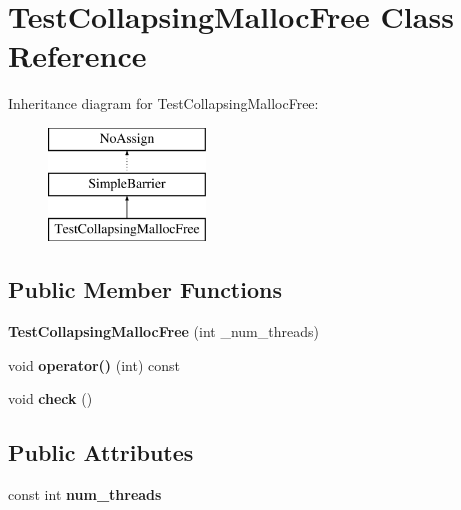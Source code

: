 \hypertarget{classTestCollapsingMallocFree}{}\section{Test\+Collapsing\+Malloc\+Free Class Reference}
\label{classTestCollapsingMallocFree}
Inheritance diagram for Test\+Collapsing\+Malloc\+Free\+:\begin{figure}[H]
\begin{center}
\leavevmode
\includegraphics[height=3.000000cm]{classTestCollapsingMallocFree}
\end{center}
\end{figure}
\subsection*{Public Member Functions}
\begin{DoxyCompactItemize}
\item 
\hypertarget{classTestCollapsingMallocFree_a00bd67fe362e0a39772e99f621ebc099}{}{\bfseries Test\+Collapsing\+Malloc\+Free} (int \+\_\+num\+\_\+threads)\label{classTestCollapsingMallocFree_a00bd67fe362e0a39772e99f621ebc099}

\item 
\hypertarget{classTestCollapsingMallocFree_adcd0828978008b9ecc8c9856cc19576c}{}void {\bfseries operator()} (int) const \label{classTestCollapsingMallocFree_adcd0828978008b9ecc8c9856cc19576c}

\item 
\hypertarget{classTestCollapsingMallocFree_ae3c6f2a63f032a4f6d4b5f35504c5467}{}void {\bfseries check} ()\label{classTestCollapsingMallocFree_ae3c6f2a63f032a4f6d4b5f35504c5467}

\end{DoxyCompactItemize}
\subsection*{Public Attributes}
\begin{DoxyCompactItemize}
\item 
\hypertarget{classTestCollapsingMallocFree_a3ebc9c8d3cfae7ce4c040fa5e594f680}{}const int {\bfseries num\+\_\+threads}\label{classTestCollapsingMallocFree_a3ebc9c8d3cfae7ce4c040fa5e594f680}

\end{DoxyCompactItemize}
